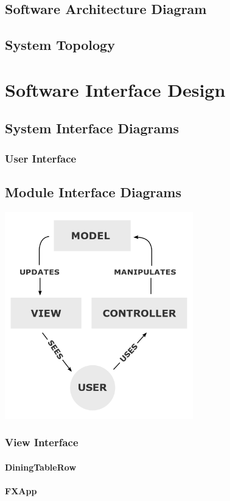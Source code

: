 \documentclass{scrreprt}
\begin{document}
\section{Software Architecture Diagram}
\section{System Topology}
\chapter{Software Interface Design}
\section{System Interface Diagrams}
\subsection{User Interface}
\section{Module Interface Diagrams}
\includegraphics[height=9cm]{MVC-Process.png}
\subsection{View Interface}
\subsubsection{DiningTableRow}
\subsubsection{FXApp}
\end{document}
